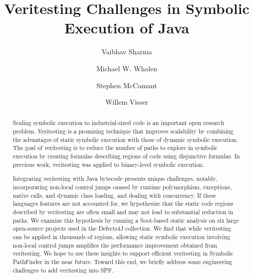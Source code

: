 \documentclass[sigconf]{acmart}
\begin{document}
\title{Veritesting Challenges in Symbolic Execution of Java}
\author{Vaibhav Sharma}

\author{Michael W. Whalen}

\author{Stephen McCamant}

\author{Willem Visser}
\renewcommand{\shortauthors}{V. Sharma et al.}


\begin{abstract}
Scaling symbolic execution to industrial-sized code is an important open research problem.
%
Veritesting is a promising technique that improves scalability by combining the advantages of static symbolic execution with those of dynamic symbolic execution.  The goal of veritesting is to reduce the number of paths to explore in symbolic execution by creating formulas describing regions of code using disjunctive formulas.
%
In previous work, veritesting was applied to binary-level symbolic execution.

Integrating veritesting with Java bytecode presents unique challenges,
notably, incorporating non-local control jumps caused by runtime polymorphism, exceptions, native calls, and dynamic class loading, and dealing with concurrency.
%
If these languages features are not accounted for, we hypothesize that the static code regions described by veritesting are often small and may not lead to substantial reduction in paths.  We examine this hypothesis by running a Soot-based static analysis on six large open-source projects used in the Defects4J collection.
%
We find that while veritesting can be applied in thousands of regions, allowing static symbolic execution involving non-local control jumps amplifies the performance improvement obtained from veritesting.
%
We hope to use these insights to support efficient veritesting in Symbolic PathFinder in the near future.  Toward this end, we briefly address some engineering challenges to add veritesting into SPF.
\end{abstract}
\end{document}
